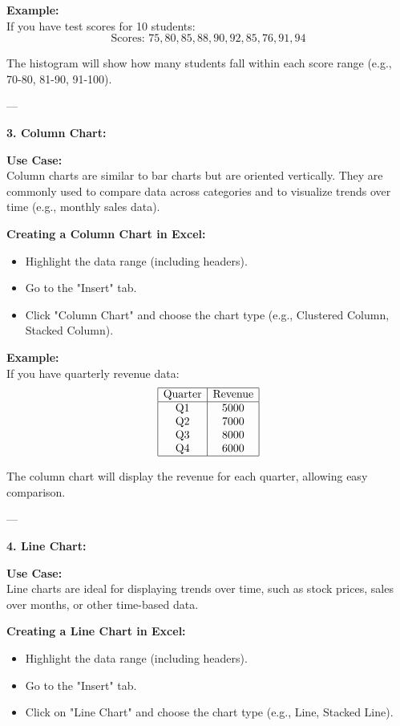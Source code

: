 \documentclass[12pt,a4paper]{book}
\begin{document}
\textbf{Example:} \\
If you have test scores for 10 students:
\[
\text{Scores: } 75, 80, 85, 88, 90, 92, 85, 76, 91, 94
\]

The histogram will show how many students fall within each score range (e.g., 70-80, 81-90, 91-100).

---

\textbf{3. Column Chart:}

\vspace{0.5cm}

\textbf{Use Case:} \\
Column charts are similar to bar charts but are oriented vertically. They are commonly used to compare data across categories and to visualize trends over time (e.g., monthly sales data).

\textbf{Creating a Column Chart in Excel:}
\begin{itemize}
    \item Highlight the data range (including headers).
    \item Go to the "Insert" tab.
    \item Click "Column Chart" and choose the chart type (e.g., Clustered Column, Stacked Column).
\end{itemize}

\textbf{Example:} \\
If you have quarterly revenue data:
\[
\begin{array}{|c|c|}
\hline
\text{Quarter} & \text{Revenue} \\
\hline
\text{Q1} & 5000 \\
\text{Q2} & 7000 \\
\text{Q3} & 8000 \\
\text{Q4} & 6000 \\
\hline
\end{array}
\]

The column chart will display the revenue for each quarter, allowing easy comparison.

---

\textbf{4. Line Chart:}

\vspace{0.5cm}

\textbf{Use Case:} \\
Line charts are ideal for displaying trends over time, such as stock prices, sales over months, or other time-based data.

\textbf{Creating a Line Chart in Excel:}
\begin{itemize}
    \item Highlight the data range (including headers).
    \item Go to the "Insert" tab.
    \item Click on "Line Chart" and choose the chart type (e.g., Line, Stacked Line).
\end{itemize}
\end{document}
